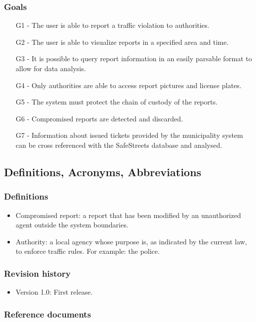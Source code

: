 \subsubsection{Goals}
\begin{itemize}
\item
[G1] - The user is able to report a traffic violation to authorities.
\item
[G2] - The user is able to visualize reports in a specified area and time.
\item
[G3] - It is possible to query report information in an easily parsable format to allow for data analysis.
\item
[G4] - Only authorities are able to access report pictures and license plates.
\item
[G5] - The system must protect the chain of custody of the reports. 
\item
[G6] - Compromised reports are detected and discarded.
\item
[G7] - Information about issued tickets provided by the municipality system can be cross referenced with the SafeStreets database and analysed.
\end{itemize}

\subsection{Definitions, Acronyms, Abbreviations}
\subsubsection{Definitions}
\begin{itemize}
    \item Compromised report: a report that has been modified by an unauthorized agent outside the system boundaries.
    \item Authority: a local agency whose purpose is, as indicated by the current law, to enforce traffic rules. For example: the police.      
\end{itemize}

\subsubsection{Revision history}
\begin{itemize}
    \item Version 1.0: First release.
\end{itemize}

\subsubsection{Reference documents}

